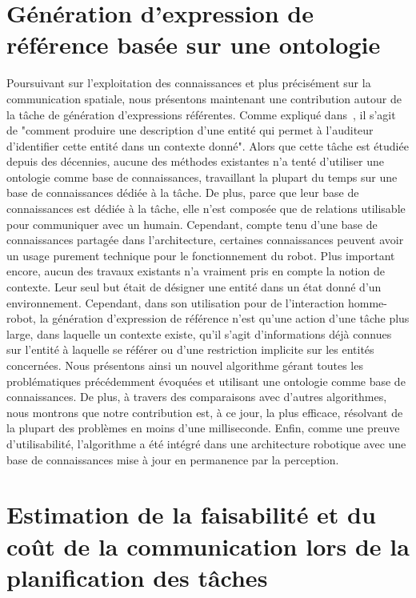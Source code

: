 \section*{Génération d'expression de référence basée sur une ontologie}

Poursuivant sur l'exploitation des connaissances et plus précisément sur la communication spatiale, nous présentons maintenant une contribution autour de la tâche de génération d'expressions référentes. Comme expliqué dans~\cite{reiter_2000_building}, il s'agit de "comment produire une description d'une entité qui permet à l'auditeur d'identifier cette entité dans un contexte donné". Alors que cette tâche est étudiée depuis des décennies, aucune des méthodes existantes n'a tenté d'utiliser une ontologie comme base de connaissances, travaillant la plupart du temps sur une base de connaissances dédiée à la tâche. De plus, parce que leur base de connaissances est dédiée à la tâche, elle n'est composée que de relations utilisable pour communiquer avec un humain. Cependant, compte tenu d'une base de connaissances partagée dans l'architecture, certaines connaissances peuvent avoir un usage purement technique pour le fonctionnement du robot. Plus important encore, aucun des travaux existants n'a vraiment pris en compte la notion de contexte. Leur seul but était de désigner une entité dans un état donné d'un environnement. Cependant, dans son utilisation pour de l'interaction homme-robot, la génération d'expression de référence n'est qu'une action d'une tâche plus large, dans laquelle un contexte existe, qu'il s'agit d'informations déjà connues sur l'entité à laquelle se référer ou d'une restriction implicite sur les entités concernées. Nous présentons ainsi un nouvel algorithme gérant toutes les problématiques précédemment évoquées et utilisant une ontologie comme base de connaissances. De plus, à travers des comparaisons avec d'autres algorithmes, nous montrons que notre contribution est, à ce jour, la plus efficace, résolvant de la plupart des problèmes en moins d'une milliseconde. Enfin, comme une preuve d'utilisabilité, l'algorithme a été intégré dans une architecture robotique avec une base de connaissances mise à jour en permanence par la perception. 

\section*{Estimation de la faisabilité et du coût de la communication lors de la planification des tâches}

